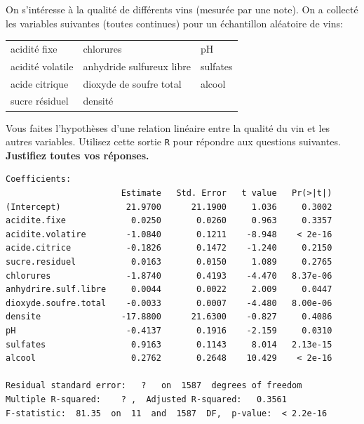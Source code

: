 \begin{questions}
\question\label{application}
On s'intéresse à la qualité de différents vins (mesurée par une note). On a collecté les variables suivantes (toutes continues) pour un échantillon aléatoire de vins:
\begin{center}
\begin{tabular}{lll}
     acidité fixe &  chlorures & pH \\
     acidité volatile &  anhydride sulfureux libre & sulfates \\
     acide citrique &   dioxyde de soufre total & alcool \\
     sucre résiduel & densité & 
\end{tabular}\end{center}
Vous faites l'hypothèses d'une relation linéaire entre la qualité du vin et les autres variables. Utilisez cette sortie \texttt{R}  pour répondre aux questions suivantes. {\bf Justifiez toutes vos réponses.}
\begin{verbatim}
Coefficients:
                       Estimate   Std. Error   t value   Pr(>|t|)    
(Intercept)             21.9700      21.1900     1.036     0.3002    
acidite.fixe             0.0250       0.0260     0.963     0.3357    
acidite.volatire        -1.0840       0.1211    -8.948    < 2e-16 
acide.citrice           -0.1826       0.1472    -1.240     0.2150    
sucre.residuel           0.0163       0.0150     1.089     0.2765    
chlorures               -1.8740       0.4193    -4.470   8.37e-06 
anhydrire.sulf.libre     0.0044       0.0022     2.009     0.0447 
dioxyde.soufre.total    -0.0033       0.0007    -4.480   8.00e-06 
densite                -17.8800      21.6300    -0.827     0.4086    
pH                      -0.4137       0.1916    -2.159     0.0310 
sulfates                 0.9163       0.1143     8.014   2.13e-15 
alcool                   0.2762       0.2648    10.429    < 2e-16 

Residual standard error:   ?   on  1587  degrees of freedom
Multiple R-squared:    ? ,	Adjusted R-squared:   0.3561 
F-statistic:  81.35  on  11  and  1587  DF,  p-value:  < 2.2e-16    
\end{verbatim}

\end{questions}
